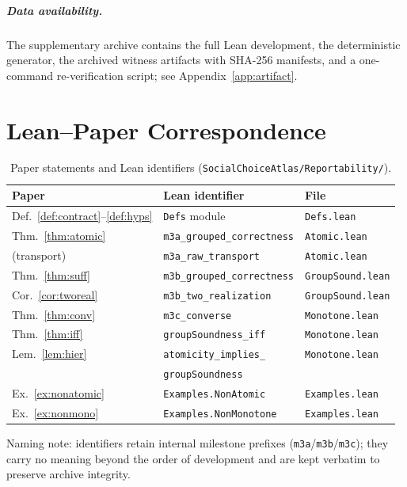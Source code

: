 \documentclass[sigplan,10pt,review,anonymous,nonacm]{acmart}
\theoremstyle{acmdefinition}
\newcommand{\code}[1]{\texttt{#1}}
\begin{document}
\subparagraph*{Data availability.}
The supplementary archive contains the
full Lean development, the deterministic generator, the archived witness
artifacts with SHA-256 manifests, and a one-command re-verification script;
see Appendix~\ref{app:artifact}.

\appendix

\section{Lean--Paper Correspondence}
\label{app:lean}

\begin{table}[h]
\caption{Paper statements and Lean identifiers
(\code{SocialChoiceAtlas/Reportability/}).}
\label{tab:lean}
\small
\begin{tabular}{@{}lll@{}}
\toprule
Paper & Lean identifier & File \\
\midrule
Def.~\ref{def:contract}--\ref{def:hyps} & \code{Defs} module & \code{Defs.lean} \\
Thm.~\ref{thm:atomic} & \code{m3a\_grouped\_correctness} & \code{Atomic.lean} \\
\quad(transport) & \code{m3a\_raw\_transport} & \code{Atomic.lean} \\
Thm.~\ref{thm:suff} & \code{m3b\_grouped\_correctness} & \code{GroupSound.lean} \\
Cor.~\ref{cor:tworeal} & \code{m3b\_two\_realization} & \code{GroupSound.lean} \\
Thm.~\ref{thm:conv} & \code{m3c\_converse} & \code{Monotone.lean} \\
Thm.~\ref{thm:iff} & \code{groupSoundness\_iff} & \code{Monotone.lean} \\
Lem.~\ref{lem:hier} & \code{atomicity\_implies\_}& \code{Monotone.lean} \\
 & \quad\code{groupSoundness} & \\
Ex.~\ref{ex:nonatomic} & \code{Examples.NonAtomic} & \code{Examples.lean} \\
Ex.~\ref{ex:nonmono} & \code{Examples.NonMonotone} & \code{Examples.lean} \\
\bottomrule
\end{tabular}
\end{table}

Naming note: identifiers retain internal milestone prefixes
(\code{m3a}/\code{m3b}/\code{m3c}); they carry no meaning beyond the order of
development and are kept verbatim to preserve archive integrity.
\end{document}
